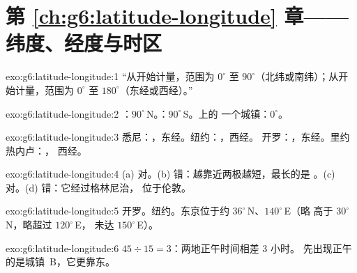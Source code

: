 \section*{第 \ref{ch:g6:latitude-longitude} 章——纬度、经度与时区}

\begin{solution}{exo:g6:latitude-longitude:1}
“从开始计量，范围为 $0^\circ$ 至
$90^\circ$（北纬或南纬）；从开始计量，范围为 $0^\circ$ 至
$180^\circ$（东经或西经）。”
\end{solution}

\begin{solution}{exo:g6:latitude-longitude:2}
：$90^\circ$\,N。：$90^\circ$\,S。上的
一个城镇：$0^\circ$。
\end{solution}

\begin{solution}{exo:g6:latitude-longitude:3}
悉尼：，东经。纽约：，西经。
开罗：，东经。里约热内卢：，
西经。
\end{solution}

\begin{solution}{exo:g6:latitude-longitude:4}
(a) 对。(b) 错：越靠近两极越短，最长的是
。(c) 对。(d) 错：它经过格林尼治，
位于伦敦。
\end{solution}

\begin{solution}{exo:g6:latitude-longitude:5}
开罗。纽约。东京位于约 $36^\circ$\,N、$140^\circ$\,E（略
高于 $30^\circ$\,N，略超过 $120^\circ$\,E，
未达 $150^\circ$\,E）。
\end{solution}

\begin{solution}{exo:g6:latitude-longitude:6}
$45 \div 15 = 3$：两地正午时间相差 3 小时。
先出现正午的是城镇~B，它更靠东。
\end{solution}

